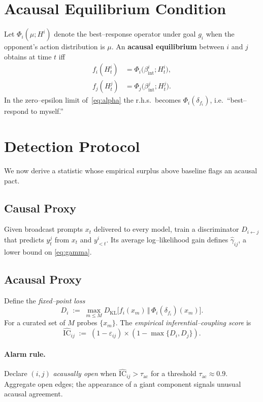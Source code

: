 \documentclass[11pt]{article}
\begin{document}
\section{Acausal Equilibrium Condition}\label{sec:aeq}
Let $\Phi_i(\mu;H^i)$ denote the best--response operator under goal $g_i$ when
the opponent’s action distribution is $\mu$.  An \textbf{acausal equilibrium}
between $i$ and $j$ obtains at time $t$ iff
\begin{equation}\label{eq:aeq}
\begin{aligned}
  f_i(H^i_t) &= \Phi_i\bigl(\beta^{i}_{\text{int}};H^i_t\bigr),\\
  f_j(H^j_t) &= \Phi_j\bigl(\beta^{j}_{\text{int}};H^j_t\bigr).
\end{aligned}
\end{equation}
In the zero--epsilon limit of~\eqref{eq:alpha} the r.h.s.\ becomes
$\Phi_i(\delta_{f_i})$, i.e.~“best--respond to myself.”

\section{Detection Protocol}
We now derive a statistic whose empirical surplus above baseline flags an
acausal pact.
\subsection{Causal Proxy}
Given broadcast prompts $x_t$ delivered to every model, train a discriminator
$D_{i\leftarrow j}$ that predicts $y^j_t$ from $x_t$ and $y^i_{<t}$.  Its average
log--likelihood gain defines $\widehat\gamma_{ij}$, a lower bound on
\eqref{eq:gamma}.

\subsection{Acausal Proxy}
Define the \emph{fixed--point loss}
\begin{equation}\label{eq:dkl}
D_i\;:=\;\max_{m\le M}D_{\mathrm{KL}}\bigl[f_i(x_m)\,\Vert\,\Phi_i(\delta_{f_i})(x_m)\bigr].
\end{equation}
For a curated set of $M$ probes $\{x_m\}$.  The \emph{empirical
inferential--coupling score} is
\begin{equation}\label{eq:ici_hat}
\widehat{\mathrm{IC}}_{ij}\;:=\;(1-\varepsilon_{ij})\times(1-\max\{D_i,D_j\}).
\end{equation}
\paragraph{Alarm rule.}  Declare $(i,j)$ \emph{acausally open} when
\(\widehat{\mathrm{IC}}_{ij}>\tau_{\mathrm{ac}}\) for a threshold
$\tau_{\mathrm{ac}}\approx0.9$.  Aggregate open edges; the appearance of a giant
component signals unusual acausal agreement.
\end{document}
